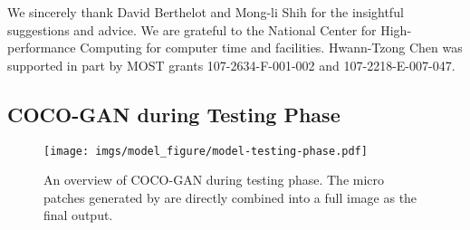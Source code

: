 \documentclass{article}
\newcommand{\modelName}{COCO-GAN }
\begin{document}
    We sincerely thank David Berthelot and Mong-li Shih for the insightful suggestions and advice. We are grateful to the National Center for High-performance Computing for computer time and facilities. Hwann-Tzong Chen was supported in part by MOST grants 107-2634-F-001-002 and 107-2218-E-007-047. 
\onecolumn
{}
\begin{appendices}

\section{\modelName during Testing Phase}
    \label{appendix:model-testing-phase}
    \begin{figure}[H]
        \centering
        \texttt{[image: imgs/model\_figure/model-testing-phase.pdf]}
        \caption{An overview of \modelName during testing phase. The micro patches generated by  are directly combined into a full image as the final output.}
        \label{fig:model-testing-phase}
        \vspace{-1em}
    \end{figure}
    

\end{appendices}
\end{document}
